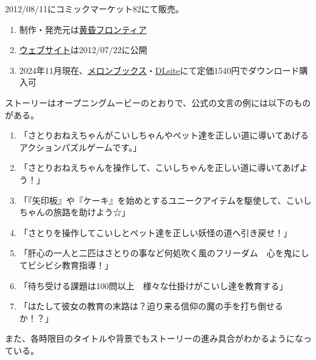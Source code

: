 

%




2012/08/11にコミックマーケット82にて販売。
\begin{enumerate}[label={\sarrow}]
\item 制作・発売元は\href{http://tasofro.net/}{黄昏フロンティア}
\item \href{http://tasofro.net/satori/}{ウェブサイト}は2012/07/22に公開
\item 2024年11月現在、\href{https://www.melonbooks.co.jp/detail/detail.php?product_id=967172}{メロンブックス}・\href{https://www.dlsite.com/home/work/=/product_id/RJ144848.html}{DLsite}にて定価1540円でダウンロード購入可
\end{enumerate}



ストーリーはオープニングムービーのとおりで、公式の文言の例には以下のものがある。
\begin{enumerate}[label={\sarrow}]
\item 「さとりおねえちゃんがこいしちゃんやペット達を正しい道に導いてあげるアクションパズルゲームです。」
\item 「さとりおねえちゃんを操作して、こいしちゃんを正しい道に導いてあげよう！」
\item 「『矢印板』や『ケーキ』を始めとするユニークアイテムを駆使して、こいしちゃんの旅路を助けよう☆」
\item 「さとりを操作してこいしとペット達を正しい妖怪の道へ引き戻せ！」
\item 「肝心の一人と二匹はさとりの事など何処吹く風のフリーダム　心を鬼にしてビシビシ教育指導！」
\item 「待ち受ける課題は100問以上　様々な仕掛けがこいし達を教育する」
\item 「はたして彼女の教育の末路は？迫り来る信仰の魔の手を打ち倒せるか！？」
\end{enumerate}
また、各時限目のタイトルや背景でもストーリーの進み具合がわかるようになっている。


